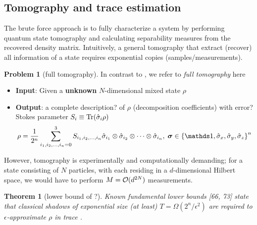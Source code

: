\documentclass[
aps,
pra,
floatfix,
]{revtex4-2}
\theoremstyle{plain}
\newtheorem{theorem}{Theorem}
\theoremstyle{definition}
\newtheorem{problem}{Problem}
\newcommand{\dm}{\rho}
\begin{document}
\subsection{Tomography and trace estimation}
The brute force approach is to fully characterize a system by performing quantum state tomography and calculating separability measures from the recovered density matrix.
Intuitively, a general tomography \cite{altepeterPhotonicStateTomography2005} that extract (recover) all information of a state requires exponential copies (samples/measurements).
\begin{problem}[full tomography]\label{prm:full_tomography}
	In contrast to , we refer to \emph{full tomography} here
	\begin{itemize}
		\item \textbf{Input}: Given a \textbf{unknown} $N$-dimensional mixed state $\dm$
		\item \textbf{Output}: a complete description? of $\dm$ (decomposition coefficients) with error?
		Stokes parameter $S_i\equiv \Tr(\hat{\sigma}_i \dm)$
		\begin{equation}\label{eq:stokes_tomography}
			\dm = \frac{1}{2^n} \sum_{i_1,i_2,\dots,i_n=0}^3
			S_{i_1,i_2,\dots,i_n} 
			\hat{\sigma}_{i_1} \otimes \hat{\sigma}_{i_2} \otimes \dots \otimes \hat{\sigma}_{i_n} 
			,\;
			\bm{\sigma}\in \qty{\identity,\sx,\sy,\sz}^n
		\end{equation}
	\end{itemize}
\end{problem}
However, tomography is experimentally and computationally demanding; for a state consisting of $N$ particles, with each residing in a $d$-dimensional Hilbert space, we would have to perform $M = \mathcal{O}(d^{2N})$ measurements.
\begin{theorem}[lower bound of ?\cite{haahSampleoptimalTomographyQuantum2017}]
	Known fundamental lower bounds [66, 73] state that classical shadows of exponential size (at least) $T = \Omega( 2^n / \epsilon^2)$ are required to $\epsilon$-approximate $\dm$ in trace .
\end{theorem}
\end{document}
